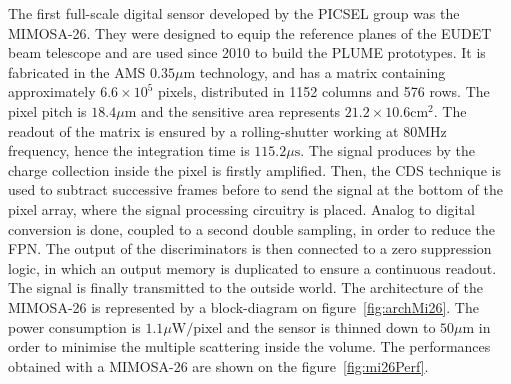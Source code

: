     The first full-scale digital sensor developed by the PICSEL group was the \gls{MIMOSA}-26.
    They were designed to equip the reference planes of the EUDET beam telescope and are used since 2010 to build the PLUME prototypes.
    It is fabricated in the AMS $0.35\mu\text{m}$ technology, and has a matrix containing approximately $6.6 \times 10^5$ pixels, distributed in 1152 columns and 576 rows.
    The pixel pitch is $18.4\mu\text{m}$ and the sensitive area represents $21.2 \times 10.6 \text{cm}^2$.
    The readout of the matrix is ensured by a rolling-shutter working at 80MHz frequency, hence the integration time is $115.2\mu\text{s}$.
    The signal produces by the charge collection inside the pixel is firstly amplified.
    Then, the \gls{CDS} technique is used to subtract successive frames before to send the signal at the bottom of the pixel array, where the signal processing circuitry is placed.
    Analog to digital conversion is done, coupled to a second double sampling, in order to reduce the \gls{FPN}.
    The output of the discriminators is then connected to a zero suppression logic, in which an output memory is duplicated to ensure a continuous readout.
    The signal is finally transmitted to the outside world.
    The architecture of the \gls{MIMOSA}-26 is represented by a block-diagram on figure~\ref{fig:archMi26}.
    The power consumption is $1.1\mu\text{W/pixel}$ and the sensor is thinned down to $50\mu\text{m}$ in order to minimise the multiple scattering inside the volume.
    The performances obtained with a \gls{MIMOSA}-26 are shown on the figure~\ref{fig:mi26Perf}.

